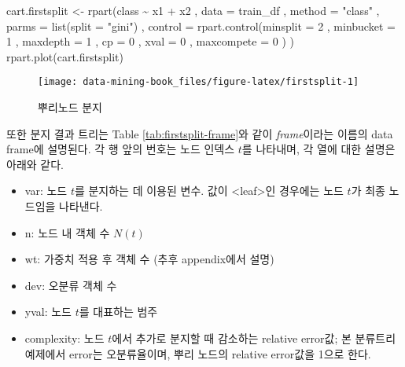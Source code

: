 \documentclass[
]{book}
\newenvironment{Shaded}{\begin{snugshade}}{\end{snugshade}}
\newcommand{\AttributeTok}[1]{\textcolor[rgb]{0.77,0.63,0.00}{#1}}
\newcommand{\DecValTok}[1]{\textcolor[rgb]{0.00,0.00,0.81}{#1}}
\newcommand{\FunctionTok}[1]{\textcolor[rgb]{0.00,0.00,0.00}{#1}}
\newcommand{\NormalTok}[1]{#1}
\newcommand{\OtherTok}[1]{\textcolor[rgb]{0.56,0.35,0.01}{#1}}
\newcommand{\SpecialCharTok}[1]{\textcolor[rgb]{0.00,0.00,0.00}{#1}}
\newcommand{\StringTok}[1]{\textcolor[rgb]{0.31,0.60,0.02}{#1}}
\providecommand{\tightlist}{%
  \setlength{\itemsep}{0pt}\setlength{\parskip}{0pt}}
\begin{document}
\begin{Shaded}
\begin{Highlighting}[]
\NormalTok{cart.firstsplit }\OtherTok{\textless{}{-}} \FunctionTok{rpart}\NormalTok{(class }\SpecialCharTok{\textasciitilde{}}\NormalTok{ x1 }\SpecialCharTok{+}\NormalTok{ x2}
\NormalTok{                  , }\AttributeTok{data =}\NormalTok{ train\_df}
\NormalTok{                  , }\AttributeTok{method =} \StringTok{"class"}
\NormalTok{                  , }\AttributeTok{parms =} \FunctionTok{list}\NormalTok{(}\AttributeTok{split =} \StringTok{"gini"}\NormalTok{)}
\NormalTok{                  , }\AttributeTok{control =} \FunctionTok{rpart.control}\NormalTok{(}\AttributeTok{minsplit =} \DecValTok{2}
\NormalTok{                                          , }\AttributeTok{minbucket =} \DecValTok{1}
\NormalTok{                                          , }\AttributeTok{maxdepth =} \DecValTok{1}
\NormalTok{                                          , }\AttributeTok{cp =} \DecValTok{0}
\NormalTok{                                          , }\AttributeTok{xval =} \DecValTok{0}
\NormalTok{                                          , }\AttributeTok{maxcompete =} \DecValTok{0}
\NormalTok{                                          )}
\NormalTok{                  )}
\FunctionTok{rpart.plot}\NormalTok{(cart.firstsplit)}
\end{Highlighting}
\end{Shaded}

\begin{figure}

{\centering \texttt{[image: data-mining-book\_files/figure-latex/firstsplit-1]} 

}

\caption{뿌리노드 분지}\label{fig:firstsplit}
\end{figure}

또한 분지 결과 트리는 Table \ref{tab:firstsplit-frame}와 같이 \emph{frame}이라는 이름의 data frame에 설명된다. 각 행 앞의 번호는 노드 인덱스 \(t\)를 나타내며, 각 열에 대한 설명은 아래와 같다.

\begin{itemize}
\tightlist
\item
  var: 노드 \(t\)를 분지하는 데 이용된 변수. 값이 \textless leaf\textgreater 인 경우에는 노드 \(t\)가 최종 노드임을 나타낸다.
\item
  n: 노드 내 객체 수 \(N(t)\)
\item
  wt: 가중치 적용 후 객체 수 (추후 appendix에서 설명)
\item
  dev: 오분류 객체 수
\item
  yval: 노드 \(t\)를 대표하는 범주
\item
  complexity: 노드 \(t\)에서 추가로 분지할 때 감소하는 relative error값; 본 분류트리 예제에서 error는 오분류율이며, 뿌리 노드의 relative error값을 1으로 한다.
\end{itemize}
\end{document}
